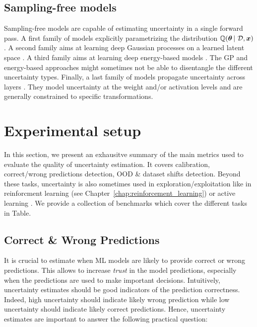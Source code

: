 \subsection{Sampling-free models}
Sampling-free models are capable of estimating uncertainty in a single forward pass. A first family of models explicitly parametrizing the distribution $\operatorname{\mathbb{Q}}(\bm{\theta} \,|\, \operatorname{\mathcal{D}}, \bm{x})$ \citep{survey_evidential_uncertainty,robustness-uncertainty-dirichlet,max_gap_id_ood,uncertainty-generative-classifier,multifaceted_uncertainty,graph-postnet, lightweight-prob-net}. A second family aims at learning deep Gaussian processes on a learned latent space \citep{uncertainty-distance-awareness, due, duq, uceloss}. A third family aims at learning deep energy-based models \citep{ood_ebm, jem_ebm}. The GP and energy-based approaches might sometimes not be able to disentangle the different uncertainty types. Finally, a last family of models propagate uncertainty across layers \citep{natural-parameter-network, sampling-free-variance-propagation, feed-forward-propagation, lightweight-prob-net, probabilistic-backprop-scalable-bnn}. They model uncertainty at the weight and/or activation levels and are generally constrained to specific transformations.


\section{Experimental setup}

In this section, we present an exhausitve summary of the main metrics used to evaluate the quality of uncertainty estimation. 
It covers calibration, correct/wrong predictions detection, OOD \& dataset shifts detection.
Beyond these tasks, uncertainty is also sometimes used in exploration/exploitation like in reinforcment learning (see Chapter~\ref{chap:reinforcement_learning}) or active learning .
We provide a collection of benchmarks which cover the different tasks in Table.~


\subsection{Correct \& Wrong Predictions}

It is crucial to estimate when ML models are likely to provide correct or wrong predictions. This allows to increase \emph{trust} in the model predictions, especially when the predictions are used to make important decisions. Intuitively, uncertainty estimates should be good indicators of the prediction correctness. Indeed, high uncertainty should indicate likely wrong prediction while low uncertainty should indicate likely correct predictions. Hence, uncertainty estimates are important to answer the following practical question:

